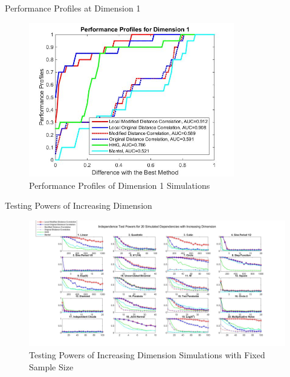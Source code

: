 \documentclass{beamer}
\begin{document}
\begin{frame}{Performance Profiles at Dimension 1}
\begin{figure}[ht]
  \centering
  \includegraphics[width=0.8\textwidth]{Fig3.jpg}
	\caption{Performance Profiles of Dimension 1 Simulations}
	\label{fig3}
\end{figure} 
\end{frame}

\begin{frame}{Testing Powers of Increasing Dimension}
\begin{figure}[ht]
  \centering
  \includegraphics[width=1.0\textwidth]{Fig5.jpg}
	\caption{Testing Powers of Increasing Dimension Simulations with Fixed Sample Size}
\end{figure} 
\end{frame}
\end{document}

